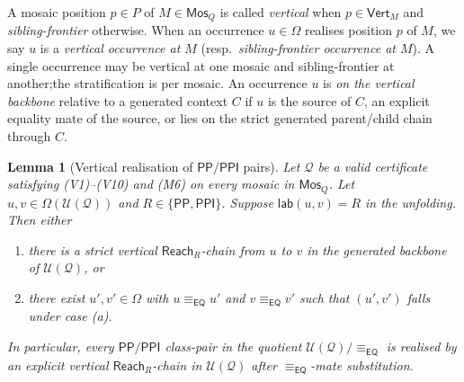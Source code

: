 \documentclass[11pt]{article}
\newtheorem{lemma}[theorem]{Lemma}
\newcommand{\EQ}{\mathsf{EQ}}
\newcommand{\PP}{\mathsf{PP}}
\newcommand{\PPI}{\mathsf{PPI}}
\newcommand{\Q}{\mathcal Q}
\newcommand{\U}{\mathcal U}
\newcommand{\Mos}{\mathsf{Mos}}
\newcommand{\Reach}{\mathrel{\mathsf{Reach}}}
\newcommand{\eqc}{\equiv_{\EQ}}
\newcommand{\lab}{\mathsf{lab}}
\newcommand{\Vrt}{\mathsf{Vert}}
\begin{document}
A mosaic position $p\in P$ of $M\in\Mos_Q$ is called \emph{vertical}
when $p\in\Vrt_M$ and \emph{sibling-frontier} otherwise.  When an
occurrence $u\in\Omega$ realises position $p$ of $M$, we say $u$ is
a \emph{vertical occurrence at $M$} (resp.~\emph{sibling-frontier
occurrence at $M$}).  A single occurrence may be vertical at one
mosaic and sibling-frontier at another;\@ the stratification is per
mosaic.  An occurrence $u$ is \emph{on the vertical backbone}
relative to a generated context $C$ if $u$ is the source of $C$, an
explicit equality mate of the source, or lies on the strict
generated parent/child chain through $C$.

\begin{lemma}[Vertical realisation of $\PP/\PPI$ pairs]\label{lem:vertical-realisation}
Let $\Q$ be a valid certificate satisfying (V1)--(V10) and (M6) on
every mosaic in $\Mos_Q$.  Let $u,v\in\Omega(\U(\Q))$ and
$R\in\{\PP,\PPI\}$.  Suppose $\lab(u,v)=R$ in the unfolding.  Then
either
\begin{enumerate}[label=(\alph*)]
\item there is a strict vertical $\Reach_R$-chain from $u$ to $v$ in
the generated backbone of $\U(\Q)$, or
\item there exist $u',v'\in\Omega$ with $u\eqc u'$ and $v\eqc v'$
such that $(u',v')$ falls under case (a).
\end{enumerate}
In particular, every $\PP/\PPI$ class-pair in the quotient
$\U(\Q)/\eqc$ is realised by an explicit vertical $\Reach_R$-chain in
$\U(\Q)$ after $\eqc$-mate substitution.
\end{lemma}
\end{document}
